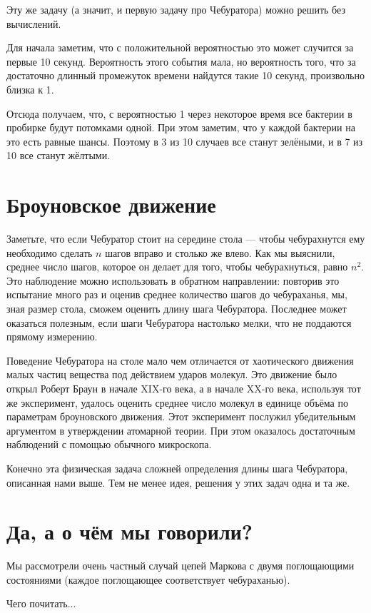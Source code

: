 \documentclass{article}
\begin{document}
\medskip

Эту же задачу (а значит, и первую задачу про Чебуратора)
можно решить без вычислений.

Для начала заметим, что с положительной вероятностью это может случится за первые 10 секунд. 
Вероятность этого события мала,
но вероятность того, что за достаточно длинный промежуток времени найдутся такие 10 секунд, произвольно близка к 1.

Отсюда получаем, что, с вероятностью 1
через некоторое время все бактерии в пробирке будут потомками одной.
При этом заметим, что у каждой бактерии на это есть равные шансы.
Поэтому в 3 из 10 случаев все станут зелёными, и в 7 из 10 все станут жёлтыми.


\section{Броуновское движение}

Заметьте, что если Чебуратор стоит на середине стола ---
чтобы чебурахнутся ему необходимо сделать $n$ шагов вправо и столько же влево.
Как мы выяснили, 
среднее число шагов, которое он делает для того, чтобы чебурахнуться, 
равно $n^2$.
Это наблюдение можно использовать в обратном направлении:
повторив это испытание много раз и 
оценив среднее количество шагов до чебураханья, мы, 
зная размер стола, сможем оценить длину шага Чебуратора.
Последнее может оказаться полезным, если шаги Чебуратора настолько мелки, что не поддаются прямому измерению. 

Поведение Чебуратора на столе мало чем отличается 
от хаотического движения малых частиц вещества под действием ударов молекул. 
Это движение было открыл Роберт Браун в начале XIX-го века, а в начале XX-го века, используя тот же эксперимент, удалось оценить среднее число молекул в единице объёма по параметрам броуновского движения.
Этот эксперимент послужил убедительным аргументом в утверждении атомарной теории.
При этом оказалось достаточным наблюдений с помощью обычного микроскопа.

Конечно эта физическая задача сложней определения длины шага Чебуратора, описанная нами выше.
Тем не менее идея, решения у этих задач одна и та же.

\section{Да, а о чём мы говорили?}

Мы рассмотрели очень частный случай цепей Маркова с двумя поглощающими состояниями (каждое поглощающее соответствует чебураханью). 

Чего почитать...
\end{document}
